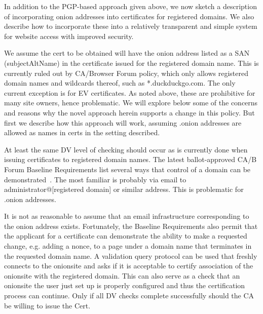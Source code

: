 \documentclass[10pt, conference, compsocconf]{styles/IEEEtran}
\begin{document}
In addition to the PGP-based approach given above,
we now sketch a description of incorporating onion addresses into
certificates for registered domains. We also describe how to
incorporate these into a relatively transparent and simple system for
website access with improved security. 


We assume the cert to be obtained will have the onion address listed
as a SAN (subjectAltName) in the certificate issued for the registered
domain name.  This is currently ruled out by CA/Browser Forum policy,
which only allows registered domain names and wildcards thereof, such
as *.duckduckgo.com. The only current exception is for EV
certificates.  As noted above, these are prohibitive for many site
owners, hence problematic. We will explore below some of the concerns
and reasons why the novel approach herein supports a change in this
policy. But first we describe how this approach will work, assuming
.onion addresses are allowed as names in certs in the setting
described.

At least the same DV level of checking should occur as is currently
done when issuing certificates to registered domain names. The latest
ballot-approved CA/B Forum Baseline Requirements list several ways
that control of a domain can be demonstrated~\cite{cabforum-br}.  The
most familiar is probably via email to administrator@[registered domain]
or similar address. This is problematic for .onion addresses.

It is not as reasonable to assume that an email infrastructure
corresponding to the onion address exists.
Fortunately, the Baseline Requirements also permit
that the applicant for a certificate can demonstrate the ability
to make a requested change, e.g. adding a nonce, to a
page under a domain name that terminates in the requested domain name. 
A  validation query protocol can be used
that freshly connects to the onionsite and asks if it is acceptable to
certify association of the onionsite with the registered domain.  This
can also serve as a check that an onionsite the user just set up is
properly configured and thus the certification process can continue.
Only if all DV checks complete successfully should the CA be willing
to issue the Cert.
\end{document}
